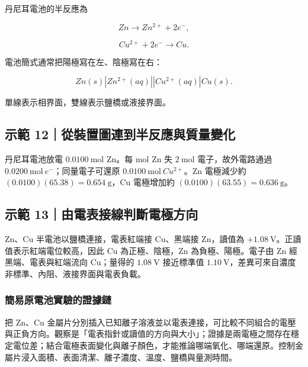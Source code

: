 \documentclass[11pt,a4paper]{article}
\begin{document}
丹尼耳電池的半反應為

\[
Zn\rightarrow Zn^{2+}+2e^-,
\]

\[
Cu^{2+}+2e^-\rightarrow Cu.
\]

電池簡式通常把陽極寫在左、陰極寫在右：

\[
Zn(s)|Zn^{2+}(aq)||Cu^{2+}(aq)|Cu(s).
\]

單線表示相界面，雙線表示鹽橋或液接界面。

\begin{HandoutWorkedExample}

\subsection{示範 12｜從裝置圖連到半反應與質量變化}\label{ux793aux7bc4-12ux5f9eux88ddux7f6eux5716ux9023ux5230ux534aux53cdux61c9ux8207ux8ceaux91cfux8b8aux5316}

丹尼耳電池放電 \(0.0100\ \mathrm{mol}\) Zn。每 mol Zn 失 \(2\ \mathrm{mol}\) 電子，故外電路通過 \(0.0200\ \mathrm{mol}\ e^-\)；同量電子可還原 \(0.0100\ \mathrm{mol}\ Cu^{2+}\)。Zn 電極減少約 \((0.0100)(65.38)=0.654\ \mathrm g\)，Cu 電極增加約 \((0.0100)(63.55)=0.636\ \mathrm g\)。

\end{HandoutWorkedExample}

\begin{HandoutWorkedExample}

\subsection{示範 13｜由電表接線判斷電極方向}\label{ux793aux7bc4-13ux7531ux96fbux8868ux63a5ux7ddaux5224ux65b7ux96fbux6975ux65b9ux5411}

Zn、Cu 半電池以鹽橋連接，電表紅端接 Cu、黑端接 Zn，讀值為 \(+1.08\ \mathrm V\)。正讀值表示紅端電位較高，因此 Cu 為正極、陰極，Zn 為負極、陽極。電子由 Zn 經黑端、電表與紅端流向 Cu；量得的 \(1.08\ \mathrm V\) 接近標準值 \(1.10\ \mathrm V\)，差異可來自濃度非標準、內阻、液接界面與電表負載。

\end{HandoutWorkedExample}

\subsubsection{簡易原電池實驗的證據鏈}\label{ux7c21ux6613ux539fux96fbux6c60ux5be6ux9a57ux7684ux8b49ux64daux93c8}

把 Zn、Cu 金屬片分別插入已知離子溶液並以電表連接，可比較不同組合的電壓與正負方向。觀察是「電表指針或讀值的方向與大小」；證據是兩電極之間存在穩定電位差；結合電極表面變化與離子顏色，才能推論哪端氧化、哪端還原。控制金屬片浸入面積、表面清潔、離子濃度、溫度、鹽橋與量測時間。
\end{document}
